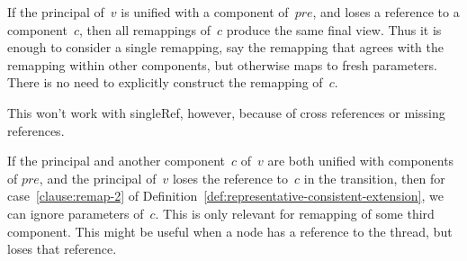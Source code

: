  

\begin{opt}
If the principal of~$v$ is unified with a component of~$pre$, and loses a
reference to a component~$c$, then all remappings of~$c$ produce the same final
view.  Thus it is enough to consider a single remapping, say the remapping that
agrees with the remapping within other components, but otherwise maps to fresh
parameters.  There is no need to explicitly construct the remapping of~$c$.  
%

This won't work with singleRef, however, because of cross references or
missing references. 
\end{opt}


\begin{improve} 
If the principal and another component~$c$ of~$v$ are both unified with
components of $pre$, and the principal of~$v$ loses the reference to~$c$ in
the transition, then for case~\ref{clause:remap-2} of
Definition~\ref{def:representative-consistent-extension}, we can ignore
parameters of~$c$.  This is only relevant for remapping of some third
component.
%
This might be useful when a node has a reference to the thread, but loses
that reference.
\end{improve}
